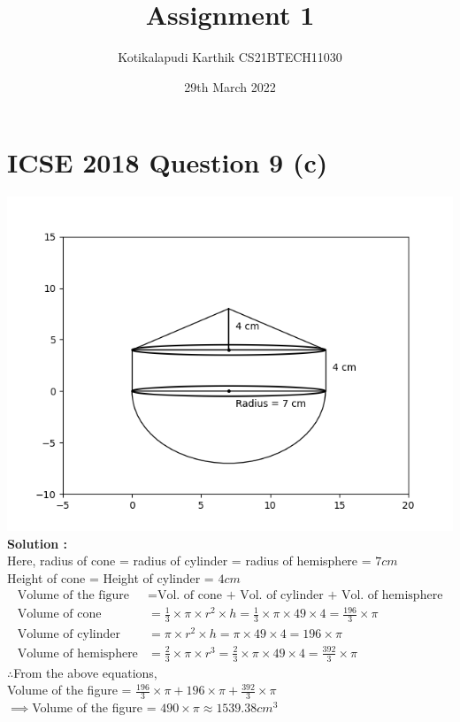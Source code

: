 \documentclass{article}
\title{Assignment 1}
\author{Kotikalapudi Karthik CS21BTECH11030}
\date{29th March 2022}
\begin{document}
\maketitle

\section*{ICSE 2018 Question 9 (c)}
\includegraphics[width=\columnwidth]{question9c.png}
\textbf{Solution :}\\
Here, radius of cone = radius of cylinder = radius of hemisphere = $7cm$\\
Height of cone = Height of cylinder = $4cm$
\begin{align}
    \text{Volume of the figure} &= \text{Vol. of cone + Vol. of cylinder + Vol. of hemisphere}
    \\
    \text{Volume of cone} &= \frac{1}{3} \times \pi \times r^2 \times h = \frac{1}{3} \times \pi \times 49 \times 4 = \frac{196}{3} \times \pi
    \\
    \text{Volume of cylinder} &= \pi \times r^2 \times h = \pi \times 49 \times 4 = 196 \times \pi
    \\
    \text{Volume of hemisphere} &= \frac{2}{3} \times \pi \times r^3 = \frac{2}{3} \times \pi \times 49 \times 4 = \frac{392}{3} \times \pi
\end{align}
$\therefore$From the above equations,\\
Volume of the figure = $\frac{196}{3} \times \pi + 196 \times \pi + \frac{392}{3} \times \pi$\\
$\implies$Volume of the figure = $490 \times \pi \approx 1539.38cm^3$
\end{document}
